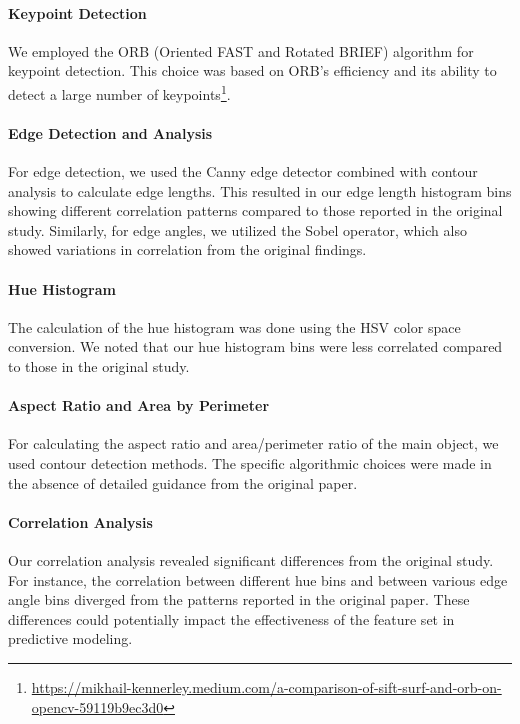 \paragraph{Keypoint Detection}
We employed the ORB (Oriented FAST and Rotated BRIEF) algorithm\supercite{Rublee2011ORBAE} for keypoint detection. This choice was based on ORB's efficiency and its ability to detect a large number of keypoints\footnote{\url{https://mikhail-kennerley.medium.com/a-comparison-of-sift-surf-and-orb-on-opencv-59119b9ec3d0}}.

\paragraph{Edge Detection and Analysis}
For edge detection, we used the Canny edge detector\supercite{canny1986computational} combined with contour analysis to calculate edge lengths. This resulted in our edge length histogram bins showing different correlation patterns compared to those reported in the original study. Similarly, for edge angles, we utilized the Sobel operator\supercite{kanopoulos1988design}, which also showed variations in correlation from the original findings.

\paragraph{Hue Histogram}
The calculation of the hue histogram was done using the HSV color space conversion. We noted that our hue histogram bins were less correlated compared to those in the original study.

\paragraph{Aspect Ratio and Area by Perimeter}
For calculating the aspect ratio and area/perimeter ratio of the main object, we used contour detection methods. The specific algorithmic choices were made in the absence of detailed guidance from the original paper.

\paragraph{Correlation Analysis}
Our correlation analysis revealed significant differences from the original study. For instance, the correlation between different hue bins and between various edge angle bins diverged from the patterns reported in the original paper. These differences could potentially impact the effectiveness of the feature set in predictive modeling.

